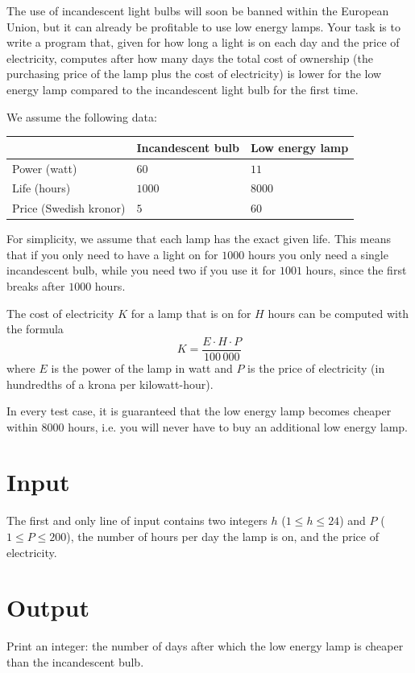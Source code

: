 The use of incandescent light bulbs will soon be banned within the European Union, but it can already be profitable to use low energy lamps.
Your task is to write a program that, given for how long a light is on each day and the price of electricity, computes after how many days the total cost of ownership (the purchasing price of the lamp plus the cost of electricity) is lower for the low energy lamp compared to the incandescent light bulb for the first time.

We assume the following data:

\begin{center}
\begin{tabular}{|l|l|l|}
\hline
& Incandescent bulb & Low energy lamp \\ \hline
Power (watt)           & $60$                & $11$             \\ \hline
Life (hours)           & $1000$              & $8000$           \\ \hline
Price (Swedish kronor) & $5$                 & $60$             \\ \hline
\end{tabular}
\end{center}

For simplicity, we assume that each lamp has the exact given life.
This means that if you only need to have a light on for $1000$ hours you only need a single incandescent bulb, while you need two if you use it for $1001$ hours, since the first breaks after $1000$ hours.

The cost of electricity $K$ for a lamp that is on for $H$ hours can be computed with the formula
$$ K = \frac{E \cdot H \cdot P}{100\,000} $$
where $E$ is the power of the lamp in watt and $P$ is the price of electricity (in hundredths of a krona per kilowatt-hour).

In every test case, it is guaranteed that the low energy lamp becomes cheaper within $8000$ hours, i.e. you will never have to buy an additional low energy lamp.

\section*{Input}
The first and only line of input contains two integers $h$ ($1 \le h \le 24$) and $P$ ($1 \le P \le 200$), the number of hours per day the lamp is on, and the price of electricity.

\section*{Output}
Print an integer: the number of days after which the low energy lamp is cheaper than the incandescent bulb.

